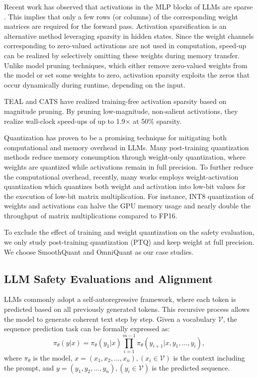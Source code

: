 Recent work has observed that activations in the MLP blocks of LLMs are sparse \cite{liu2023deja, mirzadeh2023relu}. This implies that only a few rows (or columns) of the corresponding weight matrices are required for the forward pass. Activation sparsification \cite{liu2024training, zhang2024relu, mirzadeh2023relu} is an alternative method leveraging sparsity in hidden states. Since the weight channels corresponding to zero-valued activations are not used in computation, speed-up can be realized by selectively omitting these weights during memory transfer. Unlike model pruning techniques, which either remove zero-valued weights from the model or set some weights to zero, activation sparsity exploits the zeros that occur dynamically during runtime, depending on the input.

TEAL \cite{liu2024training} and CATS \cite{leecats} have realized training-free activation sparsity based on magnitude pruning. By pruning low-magnitude, non-salient activations, they realize wall-clock speed-ups of up to 1.9$\times$ at 50\% sparsity.


Quantization has proven to be a promising technique for mitigating both computational and memory overhead in LLMs. Many post-training quantization methods \cite{lin2024awq, gptq2023, dettmers2023spqr} reduce memory consumption through weight-only quantization, where weights are quantized while activations remain in full precision. To further reduce the computational overhead, recently, many works \cite{xiao2023smoothquant, shao2023omniquant, wei2022outlier} employs weight-activation quantization which quantizes both weight and activation into low-bit values for the execution of low-bit matrix multiplication. For instance, INT8 quantization of weights and activations can halve the GPU memory usage and nearly double the throughput of matrix multiplications compared to FP16.

To exclude the effect of training and weight quantization on the safety evaluation, we only study post-training quantization (PTQ) and keep weight at full precision. We choose SmoothQuant \cite{xiao2023smoothquant} and OmniQuant \cite{shao2023omniquant} as our case studies.


\subsection{LLM Safety Evaluations and Alignment}

LLMs commonly adopt a self-autoregressive framework, where each token is predicted based on all previously generated tokens. This recursive process allows the model to generate coherent text step by step. Given a vocabulary $\mathcal{V}$, the sequence prediction task can be formally expressed as: $$\pi_{\theta}(y|x)=\pi_{\theta}(y_1|x)\prod_{i=1}^{m-1}\pi_{\theta}(y_{i+1}|x,y_1,...,y_i),$$ where $\pi_{\theta}$ is the model, $x=(x_1,x_2,...,x_n),(x_i \in \mathcal{V})$ is the context including the prompt, and $y=(y_1,y_2,...,y_n),(y_i \in \mathcal{V})$ is the predicted sequence. 

